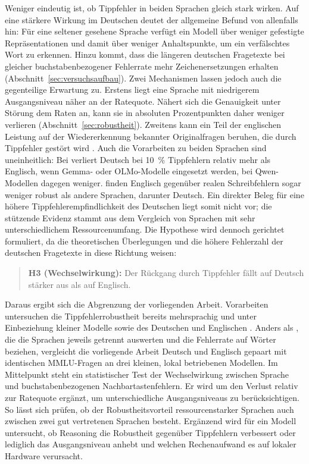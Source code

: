 \documentclass[a4paper,titlepage]{article}
\numberwithin{equation}{section} %
\begin{document}
Weniger eindeutig ist, ob Tippfehler in beiden Sprachen gleich stark wirken. Auf eine stärkere Wirkung im Deutschen deutet der allgemeine Befund von \citet{zhao_evaluating_2026} allenfalls hin: Für eine seltener gesehene Sprache verfügt ein Modell über weniger gefestigte Repräsentationen und damit über weniger Anhaltspunkte, um ein verfälschtes Wort zu erkennen. Hinzu kommt, dass die längeren deutschen Fragetexte bei gleicher buchstabenbezogener Fehlerrate mehr Zeichenersetzungen erhalten (Abschnitt~\ref{sec:versuchsaufbau}). Zwei Mechanismen lassen jedoch auch die gegenteilige Erwartung zu. Erstens liegt eine Sprache mit niedrigerem Ausgangsniveau näher an der Ratequote. Nähert sich die Genauigkeit unter Störung dem Raten an, kann sie in absoluten Prozentpunkten daher weniger verlieren (Abschnitt~\ref{sec:robustheit}). Zweitens kann ein Teil der englischen Leistung auf der Wiedererkennung bekannter Originalfragen beruhen, die durch Tippfehler gestört wird \citep{deng_investigating_2024}. Auch die Vorarbeiten zu beiden Sprachen sind uneinheitlich: Bei \citet{zhao_evaluating_2026} verliert Deutsch bei 10~\% Tippfehlern relativ mehr als Englisch, wenn Gemma- oder OLMo-Modelle eingesetzt werden, bei Qwen-Modellen dagegen weniger. \citet{aliakbarzadeh_exploring_2025} finden Englisch gegenüber realen Schreibfehlern sogar weniger robust als andere Sprachen, darunter Deutsch. Ein direkter Beleg für eine höhere Tippfehlerempfindlichkeit des Deutschen liegt somit nicht vor; die stützende Evidenz stammt aus dem Vergleich von Sprachen mit sehr unterschiedlichem Ressourcenumfang. Die Hypothese wird dennoch gerichtet formuliert, da die theoretischen Überlegungen und die höhere Fehlerzahl der deutschen Fragetexte in diese Richtung weisen:

\begin{quote}
\textbf{H3 (Wechselwirkung):} Der Rückgang durch Tippfehler fällt auf Deutsch stärker aus als auf Englisch.
\end{quote}

Daraus ergibt sich die Abgrenzung der vorliegenden Arbeit. Vorarbeiten untersuchen die Tippfehlerrobustheit bereits mehrsprachig und unter Einbeziehung kleiner Modelle sowie des Deutschen und Englischen \citep{aliakbarzadeh_exploring_2025, zhao_evaluating_2026}. Anders als \citet{zhao_evaluating_2026}, die die Sprachen jeweils getrennt auswerten und die Fehlerrate auf Wörter beziehen, vergleicht die vorliegende Arbeit Deutsch und Englisch gepaart mit identischen MMLU-Fragen an drei kleinen, lokal betriebenen Modellen. Im Mittelpunkt steht ein statistischer Test der Wechselwirkung zwischen Sprache und buchstabenbezogenen Nachbartastenfehlern. Er wird um den Verlust relativ zur Ratequote ergänzt, um unterschiedliche Ausgangsniveaus zu berücksichtigen. So lässt sich prüfen, ob der Robustheitsvorteil ressourcenstarker Sprachen auch zwischen zwei gut vertretenen Sprachen besteht. Ergänzend wird für ein Modell untersucht, ob Reasoning die Robustheit gegenüber Tippfehlern verbessert oder lediglich das Ausgangsniveau anhebt und welchen Rechenaufwand es auf lokaler Hardware verursacht.
\end{document}
